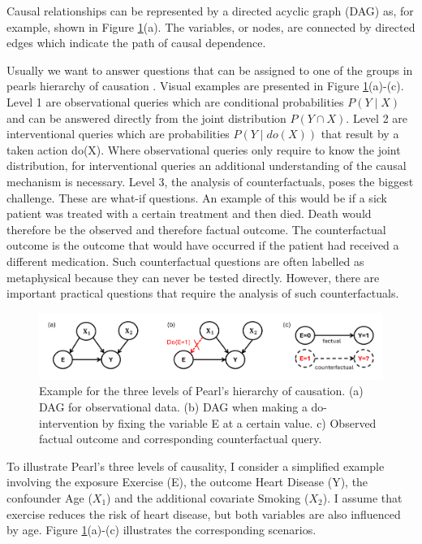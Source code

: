 Causal relationships can be represented by a directed acyclic graph (DAG) as, for example, shown in Figure \ref{fig:pearl_levels}(a). The variables, or nodes, are connected by directed edges which indicate the path of causal dependence.

Usually we want to answer questions that can be assigned to one of the groups in pearls hierarchy of causation \citet{pearl_book2009}. Visual examples are presented in Figure \ref{fig:pearl_levels}(a)-(c). Level 1 are observational queries which are conditional probabilities $P(Y \mid X)$ and can be answered directly from the joint distribution $P(Y \cap X)$. Level 2 are interventional queries which are probabilities $P(Y \mid do(X))$ that result by a taken action do(X). Where observational queries only require to know the joint distribution, for interventional queries an additional understanding of the causal mechanism is necessary. Level 3, the analysis of counterfactuals, poses the biggest challenge. These are what-if questions. An example of this would be if a sick patient was treated with a certain treatment and then died. Death would therefore be the observed and therefore factual outcome. The counterfactual outcome is the outcome that would have occurred if the patient had received a different medication. Such counterfactual questions are often labelled as metaphysical because they can never be tested directly. However, there are important practical questions that require the analysis of such counterfactuals.



\begin{figure}[H]
\centering
\includegraphics[width=1\textwidth]{img/pearl_levels.png}
\caption{Example for the three levels of Pearl's hierarchy of causation. (a) DAG for observational data. (b) DAG when making a do-intervention by fixing the variable E at a certain value. c) Observed factual outcome and corresponding counterfactual query.}
\label{fig:pearl_levels}
\end{figure}


To illustrate Pearl's three levels of causality, I consider a simplified example involving the exposure Exercise (E), the outcome Heart Disease (Y), the confounder Age ($X_1$) and the additional covariate Smoking ($X_2$). I assume that exercise reduces the risk of heart disease, but both variables are also influenced by age. Figure \ref{fig:pearl_levels}(a)-(c) illustrates the corresponding scenarios.

